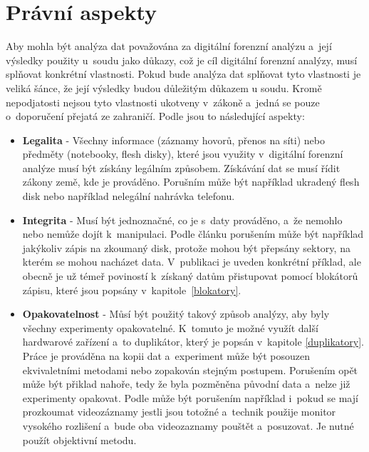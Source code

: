 \documentclass[thesis=B,czech]{FITthesis}[2012/06/26]
\begin{document}
\section{Právní aspekty}

Aby mohla být analýza dat považována za digitální forenzní analýzu a~její výsledky použity u~soudu jako důkazy, což je cíl digitální forenzní analýzy, musí splňovat konkrétní vlastnosti. Pokud bude analýza dat splňovat tyto vlastnosti je veliká šánce, že její výsledky budou důležitým důkazem u soudu. Kromě nepodjatosti nejsou tyto vlastnosti ukotveny v~zákoně a~jedná se pouze o~doporučení přejatá ze zahraničí. Podle \cite{svetlik2010digitalni} jsou to následující aspekty:

\begin{itemize}

\item \textbf{Legalita} - Všechny informace (záznamy hovorů, přenos na síti) nebo předměty (notebooky, flesh disky), které jsou využity v~digitální forenzní analýze musí být získány legálním způsobem. Získávání dat se musí řídit zákony země, kde je prováděno. Porušním může být například ukradený flesh disk nebo například nelegální nahrávka telefonu. 

\item \textbf{Integrita} - Musí být jednoznačné, co je s~daty prováděno, a~že nemohlo nebo nemůže dojít k~manipulaci. Podle článku \cite{svetlik2010digitalni} porušením může být například jakýkoliv zápis na zkoumaný disk, protože mohou být přepsány sektory, na kterém se mohou nacházet data. V~publikaci je uveden konkrétní příklad, ale obecně je už témeř poviností k~získaný datům přistupovat pomocí blokátorů zápisu, které jsou popsány v~kapitole~\ref{blokatory}.

\item \textbf{Opakovatelnost} - Můsí být použitý takový způsob analýzy, aby byly všechny experimenty opakovatelné. K~tomuto je možné využít další hardwarové zařízení a~to duplikátor, který je popsán v~kapitole \ref{duplikatory}. Práce je prováděna na kopii dat a~experiment může být posouzen ekvivaletními metodami nebo zopakován stejným postupem. Porušením opět může být přiklad nahoře, tedy že byla pozměněna původní data a~nelze již experimenty opakovat. Podle \cite{svetlik2010digitalni} může být porušením například i~pokud se mají prozkoumat videozáznamy jestli jsou totožné a~technik použije monitor vysokého rozlišení a~bude oba videozaznamy pouštět a~posuzovat. Je nutné použít objektivní metodu.


\end{itemize}
\end{document}
